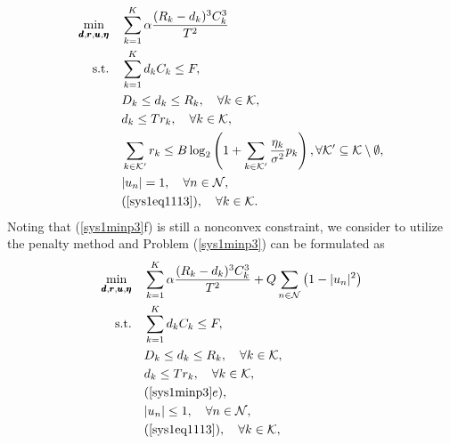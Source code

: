 \documentclass[journal]{IEEEtran}
\begin{document}
\begin{subequations}\label{sys1minp3}
	\begin{align}
	\mathop{\min}_{\pmb d, \pmb r, \pmb u, \pmb \eta}\quad
	&\sum_{k=1}^K \alpha\frac{(R_{k}-d_{k})^3 C^3_{k}}{T^2}
	\\
	\textrm{s.t.}\quad
	& \sum_{k=1}^K d_{k} C_{k}\leq F,\\
	&  D_{k} \leq d_{k} \leq R_{k}, \quad \forall k\in\mathcal K,\\
	& d_k\leq Tr_k, \quad \forall k\in\mathcal K,\\
	&\sum_{k\in\mathcal K'}r_{k} \leq
     B \log_2 \left( 1+ {\sum_{k\in\mathcal K'}\frac{\eta_k}{\sigma^2}  {p_k}} \right),
     \forall \mathcal K'\subseteq \mathcal K \setminus \emptyset,\\
    & |u_n|= 1, \quad \forall n\in\mathcal N,\\
	&(\ref{sys1eq1113}), \quad \forall k\in\mathcal K.
	\end{align}
\end{subequations}
Noting that (\ref{sys1minp3}f) is still a nonconvex constraint, we consider to utilize the penalty method and Problem (\ref{sys1minp3}) can be formulated as
\begin{subequations}\label{sys1minp44}
	\begin{align}
	\mathop{\min}_{\pmb d, \pmb r, \pmb u, \pmb \eta}\quad
	&\sum_{k=1}^K \alpha\frac{(R_{k}-d_{k})^3 C^3_{k}}{T^2}+Q\sum_{n\in\mathcal N}\left(1-|u_n|^2\right)
	\\
	\textrm{s.t.}\quad
	& \sum_{k=1}^K d_{k} C_{k}\leq F,\\
	&  D_{k} \leq d_{k} \leq R_{k}, \quad \forall k\in\mathcal K,\\
	& d_k\leq Tr_k, \quad \forall k\in\mathcal K,\\
    &(\ref{sys1minp3}e),\\
	& |u_n|\leq 1, \quad \forall n\in\mathcal N,\\
	&(\ref{sys1eq1113}), \quad \forall k\in\mathcal K,
	\end{align}
\end{subequations}
\end{document}

